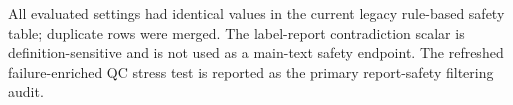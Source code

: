 \begin{table}[!htbp]
  \centering
  \caption{Supplementary Table S9. Report-level safety metrics.}
  \label{tab:s9_report_safety_metrics}
  \scriptsize
  \begin{threeparttable}
  \begin{tablenotes}[flushleft]
    \footnotesize
    \item All evaluated settings had identical values in the current legacy rule-based safety table; duplicate rows were merged. The label-report contradiction scalar is definition-sensitive and is not used as a main-text safety endpoint. The refreshed failure-enriched QC stress test is reported as the primary report-safety filtering audit.
  \end{tablenotes}
  \end{threeparttable}
\end{table}

